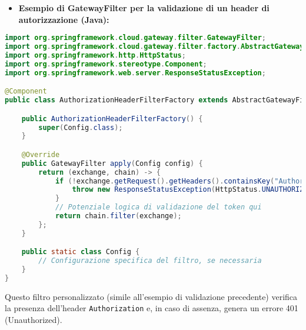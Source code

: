 \begin{itemize}
    \item \textbf{Esempio di GatewayFilter per la validazione di un header di autorizzazione (Java):}
\end{itemize}
\begin{lstlisting}[language=Java, style=JavaStyle, caption=AuthorizationHeaderFilterFactory.java]
import org.springframework.cloud.gateway.filter.GatewayFilter;
import org.springframework.cloud.gateway.filter.factory.AbstractGatewayFilterFactory;
import org.springframework.http.HttpStatus;
import org.springframework.stereotype.Component;
import org.springframework.web.server.ResponseStatusException;

@Component
public class AuthorizationHeaderFilterFactory extends AbstractGatewayFilterFactory<AuthorizationHeaderFilterFactory.Config> {

    public AuthorizationHeaderFilterFactory() {
        super(Config.class);
    }

    @Override
    public GatewayFilter apply(Config config) {
        return (exchange, chain) -> {
            if (!exchange.getRequest().getHeaders().containsKey("Authorization")) {
                throw new ResponseStatusException(HttpStatus.UNAUTHORIZED, "Missing Authorization header");
            }
            // Potenziale logica di validazione del token qui
            return chain.filter(exchange);
        };
    }

    public static class Config {
        // Configurazione specifica del filtro, se necessaria
    }
}
\end{lstlisting}
Questo filtro personalizzato (simile all'esempio di validazione precedente) verifica la presenza dell'header \texttt{Authorization} e, in caso di assenza, genera un errore 401 (Unauthorized).

